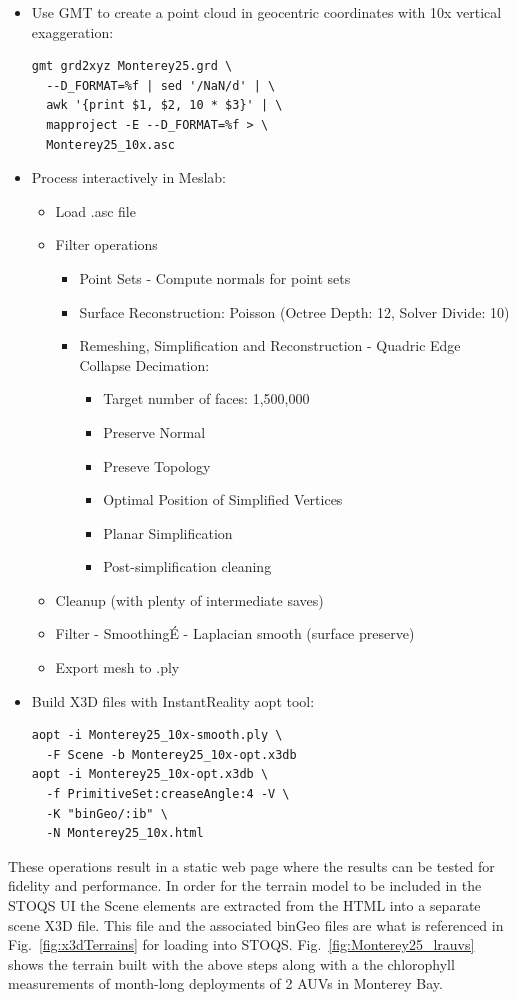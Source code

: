 \documentclass[conference]{IEEEtran}
\begin{document}
\begin{itemize}
\item Use GMT to create a point cloud in geocentric coordinates with 10x vertical exaggeration:
\begin{verbatim}
gmt grd2xyz Monterey25.grd \
  --D_FORMAT=%f | sed '/NaN/d' | \
  awk '{print $1, $2, 10 * $3}' | \ 
  mapproject -E --D_FORMAT=%f > \
  Monterey25_10x.asc
\end{verbatim}
\item Process interactively in Meslab:
\begin{itemize}
\item Load .asc file
\item Filter operations
\begin{itemize}
\item Point Sets - Compute normals for point sets
\item Surface Reconstruction: Poisson (Octree Depth: 12, Solver Divide: 10)
\item Remeshing, Simplification and Reconstruction - Quadric Edge Collapse Decimation:
\begin{itemize}
\item Target number of faces: 1,500,000
\item Preserve Normal
\item Preseve Topology
\item Optimal Position of Simplified Vertices
\item Planar Simplification
\item Post-simplification cleaning
\end{itemize}
\end{itemize}
\item Cleanup (with plenty of intermediate saves)
\item Filter - SmoothingÉ - Laplacian smooth (surface preserve)
\item Export mesh to .ply
\end{itemize}
\item Build X3D files with InstantReality aopt tool:
\begin{verbatim}
aopt -i Monterey25_10x-smooth.ply \
  -F Scene -b Monterey25_10x-opt.x3db
aopt -i Monterey25_10x-opt.x3db \
  -f PrimitiveSet:creaseAngle:4 -V \
  -K "binGeo/:ib" \
  -N Monterey25_10x.html
\end{verbatim}
\end{itemize}

These operations result in a static web page where the results can be tested for fidelity and performance. In order for the terrain model to be included in the STOQS UI the Scene elements are extracted from the HTML into a separate scene X3D file. This file and the associated binGeo files are what is referenced in Fig.~\ref{fig:x3dTerrains} for loading into STOQS. Fig.~\ref{fig:Monterey25_lrauvs} shows the terrain built with the above steps along with a the chlorophyll measurements of month-long deployments of 2 AUVs in Monterey Bay.
\end{document}
